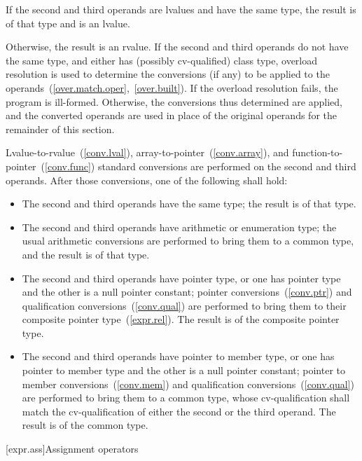 \pnum
If the second and third operands are lvalues and have the same type, the
result is of that type and is an lvalue.

\pnum
Otherwise, the result is an rvalue. If the second and third operands do
not have the same type, and either has (possibly cv-qualified) class
type, overload resolution is used to determine the conversions (if any)
to be applied to the operands~(\ref{over.match.oper},~\ref{over.built}).
If the overload resolution fails, the program is ill-formed. Otherwise,
the conversions thus determined are applied, and the converted operands
are used in place of the original operands for the remainder of this
section.

\pnum
Lvalue-to-rvalue~(\ref{conv.lval}), array-to-pointer~(\ref{conv.array}),
and function-to-pointer~(\ref{conv.func}) standard conversions are
performed on the second and third operands. After those conversions, one
of the following shall hold:

\begin{itemize}
\item The second and third operands have the same type; the result is of
that type.

\item The second and third operands have arithmetic or enumeration type;
the usual arithmetic conversions are performed to bring them to a common
type, and the result is of that type.

\item The second and third operands have pointer type, or one has
pointer type and the other is a null pointer constant; pointer
conversions~(\ref{conv.ptr}) and qualification
conversions~(\ref{conv.qual}) are performed to bring them to their
composite pointer type~(\ref{expr.rel}). The result is of the composite
pointer type.

\item The second and third operands have pointer to member type, or one
has pointer to member type and the other is a null pointer constant;
pointer to member conversions~(\ref{conv.mem}) and qualification
conversions~(\ref{conv.qual}) are performed to bring them to a common
type, whose cv-qualification shall match the cv-qualification of either
the second or the third operand. The result is of the common type.
\end{itemize}

[expr.ass]{Assignment operators}%

